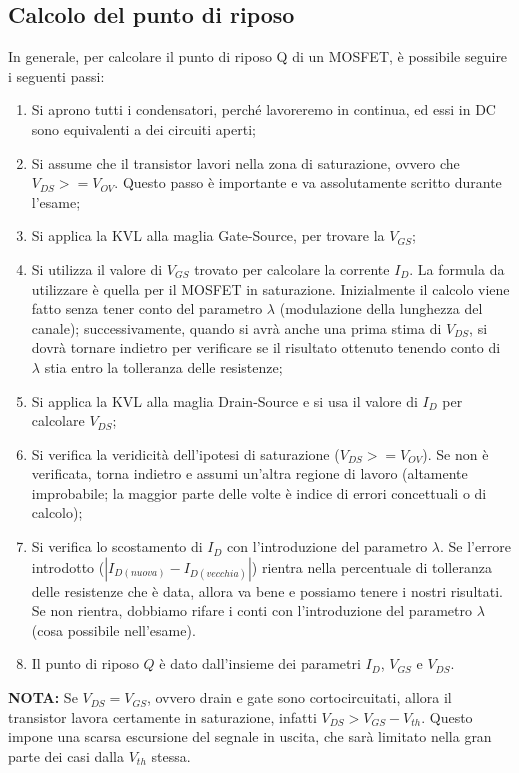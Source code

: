 \documentclass[a4paper,twocolumn,notitlepage]{book}
\begin{document}
	\subsection*{Calcolo del punto di riposo}
	In generale, per calcolare il punto di riposo Q di un MOSFET, è possibile seguire i seguenti passi:
	\begin{enumerate}
		\item
		Si aprono tutti i condensatori, perché lavoreremo in continua, ed essi in DC sono equivalenti a dei circuiti aperti;
		\item
		Si assume che il transistor lavori nella zona di saturazione, ovvero che $V_{DS} >= V_{OV}$. Questo passo è importante e va assolutamente scritto durante l'esame;
		\item
		Si applica la KVL alla maglia Gate-Source, per trovare la $V_{GS}$;
		\item
		Si utilizza il valore di $V_{GS}$ trovato per calcolare la corrente $I_D$. La formula da utilizzare è quella per il MOSFET in saturazione.\newline
		Inizialmente il calcolo viene fatto senza tener conto del parametro $\lambda$ (modulazione della lunghezza del canale); successivamente, quando si avrà anche una prima stima di $V_{DS}$, si dovrà tornare indietro per verificare se il risultato ottenuto tenendo conto di $\lambda$ stia entro la tolleranza delle resistenze;
		\item
		Si applica la KVL alla maglia Drain-Source e si usa il valore di $I_D$ per calcolare $V_{DS}$;
		\item
		Si verifica la veridicità dell'ipotesi di saturazione ($V_{DS} >= V_{OV}$). Se non è verificata, torna indietro e assumi un'altra regione di lavoro (altamente improbabile; la maggior parte delle volte è indice di errori concettuali o di calcolo);
		\item
		Si verifica lo scostamento di $I_{D}$ con l'introduzione del parametro $\lambda$. Se l'errore introdotto ($|I_{D (nuova)} - I_{D (vecchia)}|$) rientra nella percentuale di tolleranza delle resistenze che è data, allora va bene e possiamo tenere i nostri risultati.\newline
		Se non rientra, dobbiamo rifare i conti con l'introduzione del parametro $\lambda$ (cosa possibile nell'esame).
		\item
		Il punto di riposo $Q$ è dato dall'insieme dei parametri $I_D$, $V_{GS}$ e $V_{DS}$.		
		
	\end{enumerate}\medskip
	\textbf{NOTA:} Se $V_{DS}=V_{GS}$, ovvero drain e gate sono cortocircuitati, allora il transistor lavora certamente in saturazione, infatti $V_{DS} > V_{GS} - V_{th}$. Questo impone una scarsa escursione del segnale in uscita, che sarà limitato nella gran parte dei casi dalla $V_{th}$ stessa.
	
\end{document}
